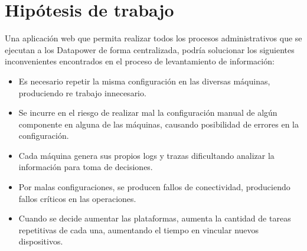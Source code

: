 \section{Hipótesis de trabajo}
Una aplicación web que permita realizar todos los procesos administrativos que se ejecutan a los Datapower  de forma centralizada, podría solucionar los siguientes inconvenientes encontrados en el proceso de levantamiento de información:
\begin{itemize}
    \item Es necesario repetir la misma configuración en las diversas máquinas, produciendo re trabajo innecesario.
    \item Se incurre en el riesgo de realizar mal la configuración manual de algún componente en alguna de las máquinas, causando posibilidad de errores en la configuración.
    \item Cada máquina genera sus propios logs y trazas dificultando analizar la información para toma de decisiones.
    \item Por malas configuraciones, se producen fallos de conectividad, produciendo fallos críticos en las operaciones.
    \item Cuando se decide aumentar las plataformas, aumenta la cantidad de tareas repetitivas de cada una, aumentando el tiempo en vincular nuevos dispositivos.
\end{itemize}
\newpage
